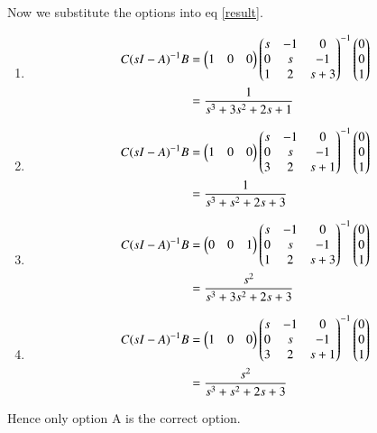 \documentclass[journal,12pt,twocolumn]{IEEEtran}
\begin{document}
Now we substitute the options into eq \ref{result}.
\begin{enumerate}
    \item \begin{align}
        C(sI-A)^{-1} B &= \begin{pmatrix}1 & 0 & 0\end{pmatrix}\begin{pmatrix}s & -1 & 0 \\ 0 & s & -1\\ 1 & 2 & s+3\end{pmatrix}^{-1}\begin{pmatrix}0 \\0 \\1\end{pmatrix}\\
        &= \dfrac{1}{s^3+3s^2+2s+1}
    \end{align}
    \item \begin{align}
        C(sI-A)^{-1} B &= \begin{pmatrix}1 & 0 & 0\end{pmatrix}\begin{pmatrix}s & -1 & 0 \\ 0 & s & -1\\ 3 & 2 & s+1\end{pmatrix}^{-1}\begin{pmatrix}0 \\0 \\1\end{pmatrix}\\
        &= \dfrac{1}{s^3+s^2+2s+3}
    \end{align}
    \item \begin{align}
        C(sI-A)^{-1} B &= \begin{pmatrix}0 & 0 & 1\end{pmatrix}\begin{pmatrix}s & -1 & 0 \\ 0 & s & -1\\ 1 & 2 & s+3\end{pmatrix}^{-1}\begin{pmatrix}0 \\0 \\1\end{pmatrix}\\
        &= \dfrac{s^2}{s^3+3s^2+2s+3}
    \end{align}
    \item \begin{align}
        C(sI-A)^{-1} B &= \begin{pmatrix}1 & 0 & 0\end{pmatrix}\begin{pmatrix}s & -1 & 0 \\ 0 & s & -1\\ 3 & 2 & s+1\end{pmatrix}^{-1}\begin{pmatrix}0 \\0 \\1\end{pmatrix}\\
        &= \dfrac{s^2}{s^3+s^2+2s+3}
    \end{align}
\end{enumerate}

Hence only option A is the correct option.
\end{document}

